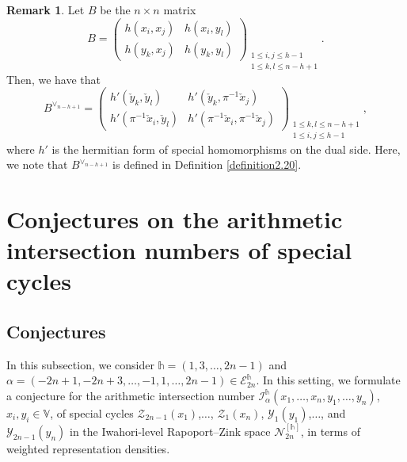 \documentclass[11pt,oneside]{amsart}
\theoremstyle{plain}
\theoremstyle{definition}
\newtheorem{remark}[theorem]{Remark}
\theoremstyle{remark}
\newcommand{\BV}{{\mathbb V}}
\newcommand{\CE}{{\mathcal E}}
\newcommand{\CI}{{\mathcal I}}
\newcommand{\CN}{{\mathcal N}}
\newcommand{\CY}{{\mathcal Y}}
\newcommand{\CZ}{{\mathcal Z}}
\numberwithin{equation}{section}
\begin{document}
	\begin{remark}\label{remark3.13} Let $B$ be the $n \times n$ matrix
		\begin{equation*}
			B=	\left(\begin{array}{cc} 
				h(x_i,x_j) & h(x_i,y_l)\\
				h(y_k,x_j)& h(y_k,y_l)
			\end{array} 
			\right)_{\substack{1\leq i,j \leq h-1\\ 1 \leq k,l \leq n-h+1}}.
		\end{equation*}
		Then, we have that
		\begin{equation*}
			B^{\vee_{n-h+1}}=\left(\begin{array}{cc} 
				h'(\check{y}_k,\check{y}_l) & h'(\check{y}_k,\pi^{-1}\check{x}_j)\\
				h'(\pi^{-1}\check{x}_i,\check{y}_l)& h'(\pi^{-1}\check{x}_i,\pi^{-1}\check{x}_j)
			\end{array} 
			\right)_{\substack{1 \leq k,l \leq n-h+1 \\ 1\leq i,j \leq h-1}},
		\end{equation*}
		where $h'$ is the hermitian form of special homomorphisms on the dual side. Here, we note that $	B^{\vee_{n-h+1}}$ is defined in Definition \ref{definition2.20}.
	\end{remark}
	
	
	
	
	
	
	
	
	
	
	
	
	
	\section{Conjectures on the arithmetic intersection numbers of special cycles}
	
	
	
	
	\subsection{Conjectures}
	In this subsection, we consider $\mathds{h}=(1,3,\dots,2n-1)$ and $\alpha=(-2n+1,-2n+3,\dots,-1,1,\dots,2n-1) \in \CE_{2n}^{\mathds{h}}$. In this setting, we formulate a conjecture for the arithmetic intersection number $\CI_{\alpha}^{\mathds{h}}(x_1,\dots,x_{n},y_1,\dots,y_{n})$, $x_i, y_i \in \BV$, of special cycles $\CZ_{2n-1}(x_1)$,$\dots$, $\CZ_{1}(x_n)$, $\CY_1(y_1)$,$\dots$, and $\CY_{2n-1}(y_n)$ in the Iwahori-level Rapoport--Zink space $\CN^{[\mathds{h}]}_{2n}$, in terms of weighted representation densities.
	
\end{document}
